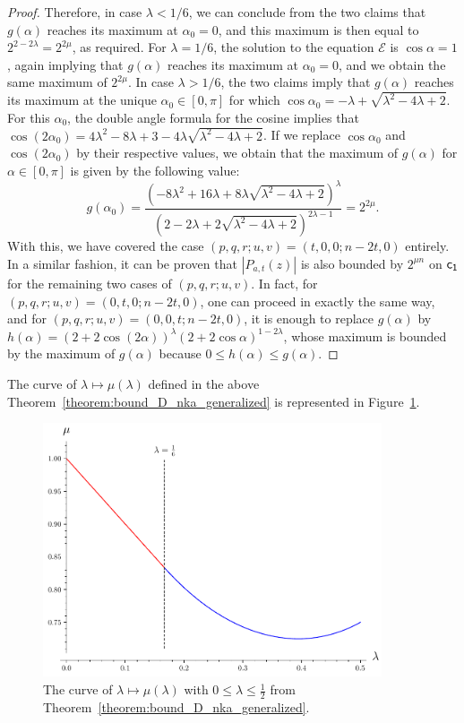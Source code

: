 \documentclass[11pt]{llncs}
\begin{document}
\begin{proof}
    Therefore, in case $\lambda<1/6$, we can conclude from the two claims that $g(\alpha)$ reaches its maximum at $\alpha_0=0$, and this maximum is then equal to $2^{2-2\lambda}=2^{2\mu}$, as required. For $\lambda=1/6$, the solution to the equation $\mathcal E$ is $\cos\alpha=1$, again implying that $g(\alpha)$ reaches its maximum at $\alpha_0=0$, and we obtain the same maximum of $2^{2\mu}$. In case $\lambda>1/6$, the two claims imply that $g(\alpha)$ reaches its maximum at the unique $\alpha_0\in[0,\pi]$ for which $\cos\alpha_0=-\lambda+\sqrt{\lambda^2-4\lambda+2}$. For this $\alpha_0$, the double angle formula for the cosine implies that $\cos(2\alpha_0)=4\lambda^2-8\lambda+3-4\lambda\sqrt{\lambda^2-4\lambda+2}$. If we replace $\cos\alpha_0$ and $\cos(2\alpha_0)$ by their respective values, we obtain that the maximum of $g(\alpha)$ for $\alpha\in[0,\pi]$ is given by the following value:
    \[
        g(\alpha_0)=\frac{\left(-8\lambda^2+16\lambda+8\lambda\sqrt{\lambda^2-4\lambda+2}\right)^{\lambda}}{\left(2-2\lambda+2\sqrt{\lambda^2-4\lambda+2}\right)^{2\lambda-1}}=2^{2\mu}.
    \]
    With this, we have covered the case $(p,q,r;u,v)=(t,0,0;n-2t,0)$ entirely. In a similar fashion, it can be proven that $|P_{a,t}(z)|$ is also bounded by $2^{\mu n}$ on $\mathsf{c_1}$ for the remaining two cases of $(p,q,r;u,v)$. In fact, for $(p,q,r;u,v)=(0,t,0;n-2t,0)$, one can proceed in exactly the same way, and for $(p,q,r;u,v)=(0,0,t;n-2t,0)$, it is enough to replace $g(\alpha)$ by $h(\alpha)=(2+2\cos(2\alpha))^\lambda(2+2\cos\alpha)^{1-2\lambda}$, whose maximum is bounded by the maximum of $g(\alpha)$ because $0\leq h(\alpha)\leq g(\alpha)$.
\end{proof}

The curve of $\lambda\mapsto\mu(\lambda)$ defined in the above Theorem~\ref{theorem:bound_D_nka_generalized} is represented in Figure~\ref{fig:curve_exponents_lambda_mu}.

\begin{figure}
	\centering
	\includegraphics[width=10cm]{curve_exponents_lambda_mu.pdf}
    \vspace{-5mm}
	\caption{The curve of $\lambda\mapsto\mu(\lambda)$ with $0\leq\lambda\leq\frac 12$ from Theorem~\ref{theorem:bound_D_nka_generalized}.}
	\label{fig:curve_exponents_lambda_mu}
\end{figure}
\end{document}
